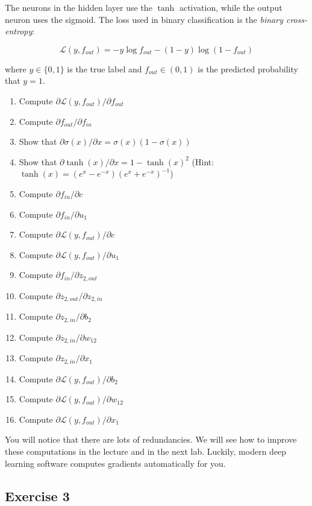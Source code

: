 \documentclass[
  a4paper,
]{article}
\providecommand{\tightlist}{%
  \setlength{\itemsep}{0pt}\setlength{\parskip}{0pt}}
\begin{document}
The neurons in the hidden layer use the \(\tanh\) activation, while the
output neuron uses the sigmoid. The loss used in binary classification
is the \emph{binary cross-entropy}:

\[
\mathcal{L}(y, f_{out})=-y\log f_{out}-(1-y)\log(1-f_{out})
\]

where \(y\in\{0,1\}\) is the true label and \(f_{out}\in(0,1)\) is the
predicted probability that \(y=1\).

\begin{enumerate}
\def\labelenumi{\arabic{enumi}.}
\tightlist
\item
  Compute \(\partial\mathcal{L}(y, f_{out})/\partial f_{out}\)
\item
  Compute \(\partial f_{out}/\partial f_{in}\)
\item
  Show that \(\partial\sigma(x)/\partial x=\sigma(x)(1-\sigma(x))\)
\item
  Show that \(\partial\tanh(x)/\partial x=1-\tanh(x)^2\) (Hint:
  \(\tanh(x)=(e^x-e^{-x})(e^x+e^{-x})^{-1}\))
\item
  Compute \(\partial f_{in}/\partial c\)
\item
  Compute \(\partial f_{in}/\partial u_1\)
\item
  Compute \(\partial\mathcal{L}(y, f_{out})/\partial c\)
\item
  Compute \(\partial\mathcal{L}(y, f_{out})/\partial u_1\)
\item
  Compute \(\partial f_{in}/\partial z_{2,out}\)
\item
  Compute \(\partial z_{2,out}/\partial z_{2,in}\)
\item
  Compute \(\partial z_{2,in}/\partial b_2\)
\item
  Compute \(\partial z_{2,in}/\partial w_{12}\)
\item
  Compute \(\partial z_{2,in}/\partial x_1\)
\item
  Compute \(\partial\mathcal{L}(y, f_{out})/\partial b_2\)
\item
  Compute \(\partial\mathcal{L}(y, f_{out})/\partial w_{12}\)
\item
  Compute \(\partial\mathcal{L}(y, f_{out})/\partial x_1\)
\end{enumerate}

You will notice that there are lots of redundancies. We will see how to
improve these computations in the lecture and in the next lab. Luckily,
modern deep learning software computes gradients automatically for you.

\hypertarget{exercise-3}{%
\subsection{Exercise 3}\label{exercise-3}}
\end{document}
